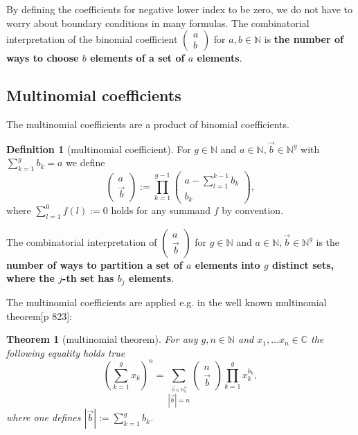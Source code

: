 \documentclass{article}
\theoremstyle{theorem}
\newtheorem{theorem}{Theorem}
\theoremstyle{definition}
\newtheorem*{definition}{Definition}
\begin{document}
By defining the coefficients for negative lower index to be zero, we do not have to worry about boundary conditions in
many formulas. The combinatorial interpretation of the binomial coefficient \(\begin{pmatrix}a \\ b\end{pmatrix}\) for
\(a,b\in\mathbb{N}\) is \textbf{the number of ways to choose \(b\) elements of a set of \(a\) elements}. 

\subsection{Multinomial coefficients}

The multinomial coefficients are a product of binomial coefficients.
\begin{definition}[multinomial coefficient]
For \(g\in\mathbb{N}\) and \(a\in\mathbb{N},\vec{b}\in\mathbb{N}^g\) with \(\sum_{k=1}^g b_k=a\)
we define
\begin{equation}
\begin{pmatrix}a\\\vec{b}\end{pmatrix}:= \prod_{k=1}^{g-1} \begin{pmatrix}a-\sum_{l=1}^{k-1} b_k\\b_k\end{pmatrix},
\end{equation}
where \(\sum_{l=1}^0 f(l):=0\) holds for any summand \(f\) by convention. 
\end{definition}

The combinatorial interpretation of \(\begin{pmatrix}a\\\vec{b}\end{pmatrix}\) for \(g\in\mathbb{N}\) and
 \(a\in\mathbb{N},\vec{b}\in\mathbb{N}^g\) is the \textbf{number of ways to partition a set of \(a\) elements into 
 \(g\) distinct sets, where the \(j\)-th set has \(b_j\) elements}. 
 
The multinomial coefficients are applied e.g. in the well known multinomial theorem\cite{abramowitz1964handbook}[p 823]:

\begin{theorem}[multinomial theorem]
For any \(g,n\in\mathbb{N}\) and \(x_1,\dots x_n\in\mathbb{C}\) the following equality holds true
\begin{equation}
\left(\sum_{k=1}^g x_k\right)^n= \sum_{\stackrel{\vec{b}\in\mathbb{N}_0^g}{|\vec{b}|=n}}\begin{pmatrix}n\\\vec{b}\end{pmatrix} \prod_{k=1}^g x_k^{b_k},
\end{equation}
where one defines \(|\vec{b}|:=\sum_{k=1}^g b_k\). 
\end{theorem} 
\end{document}
